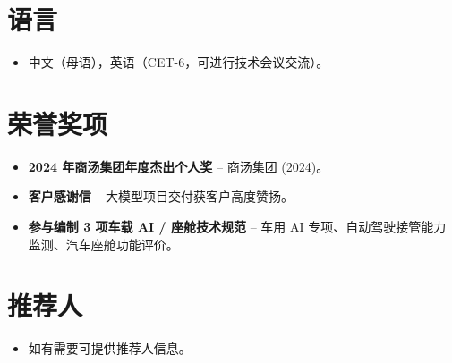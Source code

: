 \documentclass[11pt,a4paper,sans]{moderncv}
\begin{document}

\section{语言}
\vspace{1pt}
\begin{itemize}
\item {中文（母语），英语（CET-6，可进行技术会议交流）。}
\end{itemize}


\section{荣誉奖项}
\vspace{1pt}
\begin{itemize}
\item{\textbf{2024 年商汤集团年度杰出个人奖} -- 商汤集团 (2024)。}
\item{\textbf{客户感谢信} -- 大模型项目交付获客户高度赞扬。}
\item{\textbf{参与编制 3 项车载 AI / 座舱技术规范} -- 车用 AI 专项、自动驾驶接管能力监测、汽车座舱功能评价。}
\end{itemize}


\section{推荐人}
\vspace{1pt}
\begin{itemize}
\item{如有需要可提供推荐人信息。}
\end{itemize}
\end{document}
